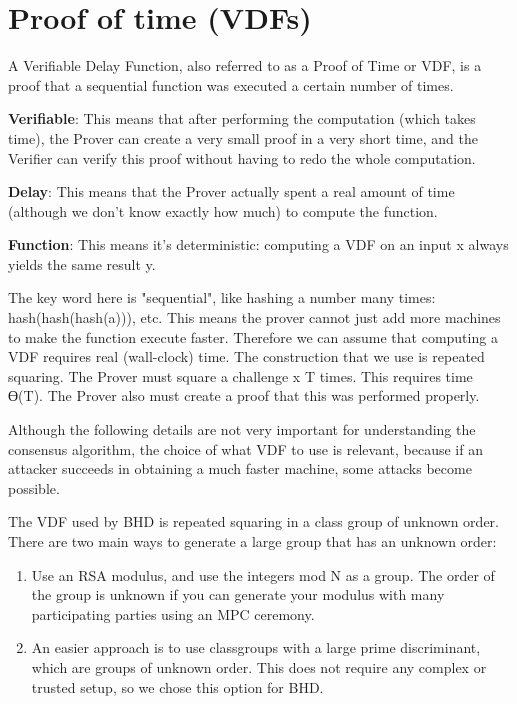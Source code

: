 \section{Proof of time (VDFs)}
\begin{flushleft}
    A Verifiable Delay Function, also referred to as a Proof of Time or VDF, is a proof that a sequential function was executed a certain number of times.
\end{flushleft}
\begin{flushleft}
    \textbf{Verifiable}: This means that after performing the computation (which takes time), the Prover can create a very small proof in a very short time, and the Verifier can verify this proof without having to redo the whole computation.
\end{flushleft}
\begin{flushleft}
    \textbf{Delay}: This means that the Prover actually spent a real amount of time (although we don’t know exactly how much) to compute the function.
\end{flushleft}
\begin{flushleft}
    \textbf{Function}: This means it’s deterministic: computing a VDF on an input x always yields the same result y.
\end{flushleft}
\begin{flushleft}
    The key word here is "sequential", like hashing a number many times: hash(hash(hash(a))), etc. This means the prover cannot just add more machines to make the function execute faster. Therefore we can assume that computing a VDF requires real (wall-clock) time. The construction that we use is repeated squaring. The Prover must square a challenge x T times. This requires time ϴ(T). The Prover also must create a proof that this was performed properly.
\end{flushleft}
\begin{flushleft}
    Although the following details are not very important for understanding the consensus algorithm, the choice of what VDF to use is relevant, because if an attacker succeeds in obtaining a much faster machine, some attacks become possible.
\end{flushleft}
\begin{flushleft}
    The VDF used by BHD is repeated squaring in a class group of unknown order. There are two main ways to generate a large group that has an unknown order:
\end{flushleft}
\begin{enumerate}
    \item Use an RSA modulus, and use the integers mod N as a group. The order of the group is unknown if you can generate your modulus with many participating parties using an MPC ceremony.
    \item An easier approach is to use classgroups with a large prime discriminant, which are groups of unknown order. This does not require any complex or trusted setup, so we chose this option for BHD.
\end{enumerate}
